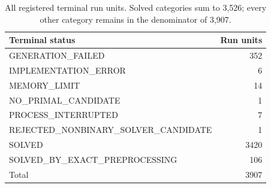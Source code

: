 \begin{table}[htbp]
\caption{All registered terminal run units. Solved categories sum to 3,526; every other category remains in the denominator of 3,907.}
\label{tab:current-terminal-counts}
\centering\small
\begin{tabular}{@{}lr@{}}
\toprule
Terminal status & Run units \\
\midrule
GENERATION\_FAILED & 352 \\
IMPLEMENTATION\_ERROR & 6 \\
MEMORY\_LIMIT & 14 \\
NO\_PRIMAL\_CANDIDATE & 1 \\
PROCESS\_INTERRUPTED & 7 \\
REJECTED\_NONBINARY\_SOLVER\_CANDIDATE & 1 \\
SOLVED & 3420 \\
SOLVED\_BY\_EXACT\_PREPROCESSING & 106 \\
\midrule
Total & 3907 \\
\bottomrule
\end{tabular}
\end{table}
